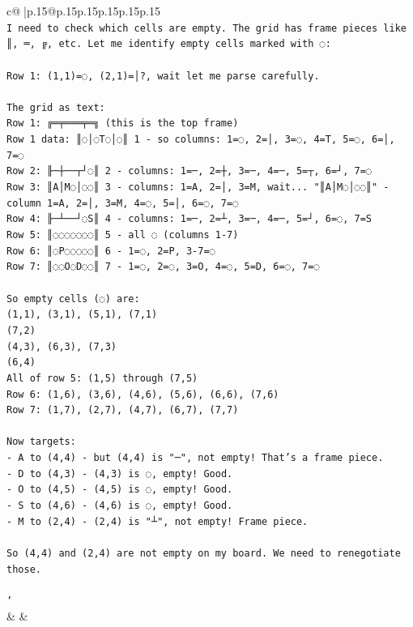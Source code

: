 \documentclass{article}
\begin{document}
{\begin{supertabular}{c@{$\;$}|p{.15\linewidth}@{}p{.15\linewidth}p{.15\linewidth}p{.15\linewidth}p{.15\linewidth}p{.15\linewidth}}
{{{\\ 
\texttt{I need to check which cells are empty. The grid has frame pieces like ║, ═, ╔, etc. Let me identify empty cells marked with ◌:} \\
\\ 
\texttt{Row 1: (1,1)=◌, (2,1)=│?, wait let me parse carefully.} \\
\\ 
\texttt{The grid as text:} \\
\texttt{Row 1: ╔═╤═══╤═╗ (this is the top frame)} \\
\texttt{Row 1 data: ║◌│◌T◌│◌║ 1 {-} so columns: 1=◌, 2=│, 3=◌, 4=T, 5=◌, 6=│, 7=◌} \\
\texttt{Row 2: ╟─┼──┬┘◌║ 2 {-} columns: 1=─, 2=┼, 3=─, 4=─, 5=┬, 6=┘, 7=◌} \\
\texttt{Row 3: ║A│M◌│◌◌║ 3 {-} columns: 1=A, 2=│, 3=M, wait... "║A│M◌│◌◌║" {-} column 1=A, 2=│, 3=M, 4=◌, 5=│, 6=◌, 7=◌} \\
\texttt{Row 4: ╟─┴──┘◌S║ 4 {-} columns: 1=─, 2=┴, 3=─, 4=─, 5=┘, 6=◌, 7=S} \\
\texttt{Row 5: ║◌◌◌◌◌◌◌║ 5 {-} all ◌ (columns 1{-}7)} \\
\texttt{Row 6: ║◌P◌◌◌◌◌║ 6 {-} 1=◌, 2=P, 3{-}7=◌} \\
\texttt{Row 7: ║◌◌O◌D◌◌║ 7 {-} 1=◌, 2=◌, 3=O, 4=◌, 5=D, 6=◌, 7=◌} \\
\\ 
\texttt{So empty cells (◌) are:} \\
\texttt{(1,1), (3,1), (5,1), (7,1)} \\
\texttt{(7,2)} \\
\texttt{(4,3), (6,3), (7,3)} \\
\texttt{(6,4)} \\
\texttt{All of row 5: (1,5) through (7,5)} \\
\texttt{Row 6: (1,6), (3,6), (4,6), (5,6), (6,6), (7,6)} \\
\texttt{Row 7: (1,7), (2,7), (4,7), (6,7), (7,7)} \\
\\ 
\texttt{Now targets:} \\
\texttt{{-} A to (4,4) {-} but (4,4) is "─", not empty! That's a frame piece.} \\
\texttt{{-} D to (4,3) {-} (4,3) is ◌, empty! Good.} \\
\texttt{{-} O to (4,5) {-} (4,5) is ◌, empty! Good.} \\
\texttt{{-} S to (4,6) {-} (4,6) is ◌, empty! Good.} \\
\texttt{{-} M to (2,4) {-} (2,4) is "┴", not empty! Frame piece.} \\
\\ 
\texttt{So (4,4) and (2,4) are not empty on my board. We need to renegotiate those.} \\
\\ 
\texttt{'} \\
            }
        }
    }
    & & \\ \\


\end{supertabular}}
\end{document}

